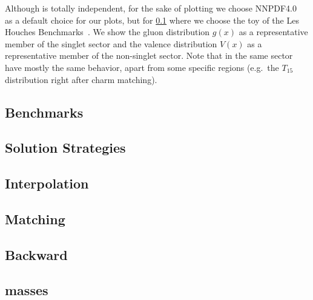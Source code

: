 Although \eko{} is totally \pdf{} independent, for the sake of plotting
we choose NNPDF4.0~\cite{NNPDF:2021njg} as a default choice for
our plots, but for \cref{sec:pheno:bench} where we choose the toy \pdf{} of the
Les Houches Benchmarks~\cite{Giele:2002hx,Dittmar:2005ed}.
We show the gluon distribution $g(x)$ as a
representative member of the singlet sector and the valence distribution $V(x)$
as a representative member of the non-singlet sector.
Note that \pdfs in the same sector have mostly the same behavior, apart from
some specific regions (e.g.\ the $T_{15}$ distribution right after charm
matching).

\subsection{Benchmarks}
\label{sec:pheno:bench}


\subsection{Solution Strategies}
\label{sec:pheno:sols}


\subsection{Interpolation}
\label{sec:pheno:interp}


\subsection{Matching}
\label{sec:pheno:match}


\subsection{Backward}
\label{sec:pheno:back}


\subsection{\msbar{} masses}
\label{sec:pheno:msbarmass}

